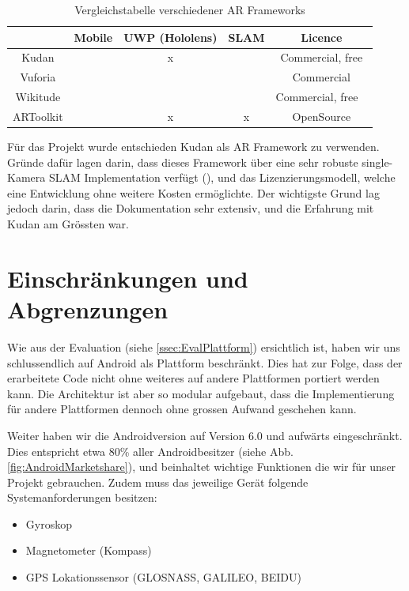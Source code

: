 \documentclass[a4paper]{scrreprt}
\begin{document}
\begin{table}[h!]
	\center
	\begin{tabular}{|c|c|c|c|c|}
		\hline 
		& \textbf{Mobile} & \textbf{UWP (Hololens)} & \textbf{SLAM} & \textbf{Licence} \\ 
		\hline 
		Kudan & \checkmark & x & \checkmark & Commercial, free \\ 
		\hline 
		Vuforia & \checkmark & \checkmark & \checkmark & Commercial \\ 
		\hline 
		Wikitude & \checkmark & \checkmark & \checkmark & Commercial, free \ \\ 
		\hline 
		ARToolkit & \checkmark & x & x & OpenSource \\ 
		\hline 
	\end{tabular}
	\caption{Vergleichstabelle verschiedener AR Frameworks}
\end{table}


Für das Projekt wurde entschieden Kudan als AR Framework zu verwenden. Gründe dafür lagen darin, dass dieses Framework über eine sehr robuste single-Kamera SLAM Implementation verfügt (\cite{BerfinAyhan2017}), und das Lizenzierungsmodell, welche eine Entwicklung ohne weitere Kosten ermöglichte. Der wichtigste Grund lag jedoch darin, dass die Dokumentation sehr extensiv, und die Erfahrung mit Kudan am Grössten war.

\section{Einschränkungen und Abgrenzungen}

Wie aus der Evaluation (siehe \ref{ssec:EvalPlattform}) ersichtlich ist, haben wir uns schlussendlich auf Android als Plattform beschränkt. Dies hat zur Folge, dass der erarbeitete Code nicht ohne weiteres auf andere Plattformen portiert werden kann. Die Architektur ist aber so modular aufgebaut, dass die Implementierung für andere Plattformen dennoch ohne grossen Aufwand geschehen kann.

Weiter haben wir die Androidversion auf Version 6.0 und aufwärts eingeschränkt. Dies entspricht etwa 80\% aller Androidbesitzer (siehe Abb. \ref{fig:AndroidMarketshare}), und beinhaltet wichtige Funktionen die wir für unser Projekt gebrauchen. Zudem muss das jeweilige Gerät folgende Systemanforderungen besitzen:
\begin{itemize}
	\item Gyroskop
	\item Magnetometer (Kompass)
	\item GPS Lokationssensor (GLOSNASS, GALILEO, BEIDU)
\end{itemize}
\end{document}

